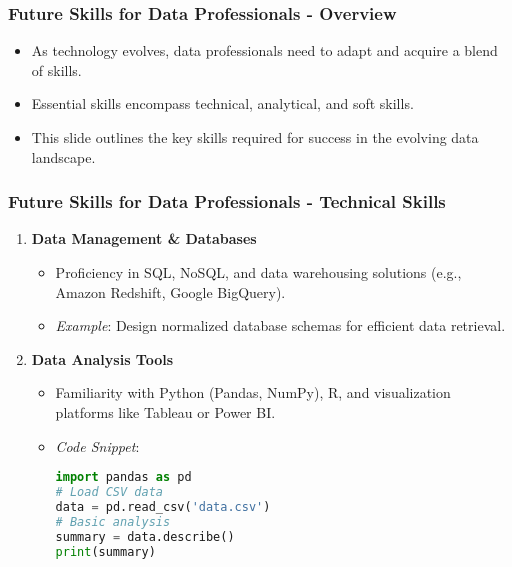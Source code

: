 \documentclass{beamer}
\begin{document}
\begin{frame}[fragile]
    \frametitle{Future Skills for Data Professionals - Overview}
    \begin{itemize}
        \item As technology evolves, data professionals need to adapt and acquire a blend of skills.
        \item Essential skills encompass technical, analytical, and soft skills.
        \item This slide outlines the key skills required for success in the evolving data landscape.
    \end{itemize}
\end{frame}

\begin{frame}[fragile]
    \frametitle{Future Skills for Data Professionals - Technical Skills}
    \begin{enumerate}
        \item \textbf{Data Management \& Databases}
            \begin{itemize}
                \item Proficiency in SQL, NoSQL, and data warehousing solutions (e.g., Amazon Redshift, Google BigQuery).
                \item \textit{Example}: Design normalized database schemas for efficient data retrieval.
            \end{itemize}
        \item \textbf{Data Analysis Tools}
            \begin{itemize}
                \item Familiarity with Python (Pandas, NumPy), R, and visualization platforms like Tableau or Power BI.
                \item \textit{Code Snippet}:
                \begin{lstlisting}[language=Python]
import pandas as pd
# Load CSV data
data = pd.read_csv('data.csv')
# Basic analysis
summary = data.describe()
print(summary)
                \end{lstlisting}
            \end{itemize}
    \end{enumerate}
\end{frame}
\end{document}
